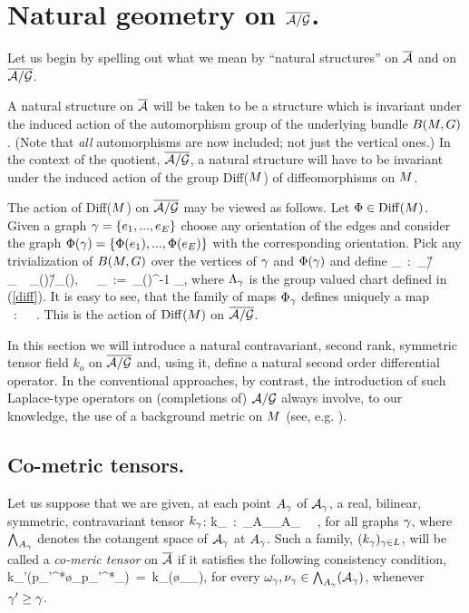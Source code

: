 \bigskip\goodbreak

\section{Natural geometry on $\agb$.}

Let us begin by spelling out what we mean by ``natural structures'' on
$\Ab$ and on $\agb$.

A natural structure on $\ab$ will be taken to be a structure which is
invariant under the induced action of the automorphism group of the
underlying bundle $B(\S,G)$. (Note that {\it all} automorphisms are
now included; not just the vertical ones.) In the context of the
quotient, $\agb$, a natural structure will have to be invariant under
the induced action of the group Diff($\S$) of diffeomorphisms on $\S$.

The action of Diff($\S$) on $\agb$ may be viewed as follows. Let
$\Phi\in \Diff(\S)$.  Given a graph $\g=\{e_1,...,e_E\}$ choose any
orientation of the edges and consider the graph $\Phi(\g) =
\{\Phi(e_1),...,\Phi(e_E)\}$ with the corresponding orientation. Pick
any trivialization of $B(\S,G)$ over the vertices of $\g$ and
$\Phi(\g)$ and define
\be
\Phi_\g\ :\ \A_\g/\G_\g\ \rightarrow\ \A_{\Phi(\g)}/\G_{\Phi(\g)},\ \ \
\Phi_\g\ :=\   \Lambda_{\Phi(\g)}^{-1} \circ \Lambda_\g,
\ee
where $\Lambda_\g$ is the group valued chart defined in (\ref{diff}).
It is easy to see, that the family of maps $\Phi_\g$ defines uniquely
a map
\be
\overline{\Phi}\ :\ \agb\ \rightarrow\ \agb.
\ee
This is the action of $\Diff(\S)$ on $\agb$.  
\bigskip

In this section we will introduce a natural contravariant, second
rank, symmetric tensor field $k_o$ on $\agb$ and, using it, define a
natural second order differential operator. In the conventional
approaches, by contrast, the introduction of such Laplace-type
operators on (completions of) $\ag$ always involve, to our knowledge,
the use of a background metric on $\S$ (see, e.g. \cite{AM}).

\goodbreak
\subsection{Co-metric tensors.}  

Let us suppose that we are given, at each point $A_\g$ of $\A_\g$, a
real, bilinear, symmetric, contravariant tensor $k_\g$:
\be
k_\g \ :\ \bigwedge{}_{A_\g}\times \bigwedge{}_{A_\g}\ \rightarrow
\ \RR,
\ee  
for all graphs $\g$, where $\bigwedge_{A_\g}$ denotes the cotangent
space of $\A_\g$ at $A_\g$. Such a family, $(k_\g)_{\g\in L}$, will be
called a {\it co-meric tensor} on $\ab$ if it satisfies the following
consistency condition,
\be
k_{\g'}(p_{\g\g'}^*\o_\g\wedge p_{\g\g'}^*\nu_\g)\ =\ 
k_{\g}(\o_\g\wedge\nu_\g), 
\ee
for every $\o_\g,\nu_\g\in\bigwedge_{A_\g}(\A_\g)$, whenever $\g'\ge\g$.


